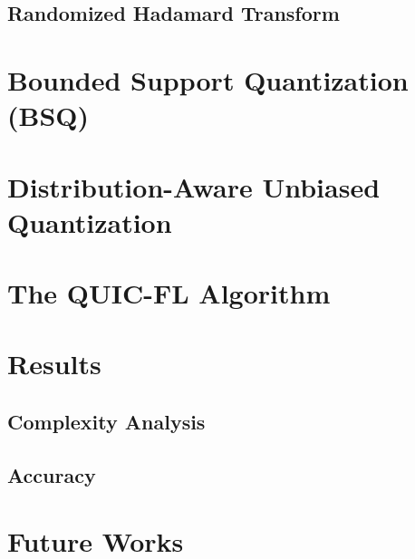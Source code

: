 \documentclass[journal,12pt,twocolumn]{IEEEtran}
\begin{document}
    \subsection{Randomized Hadamard Transform}
    \label{ssec:rht}
\section{Bounded Support Quantization (BSQ)}
\label{sec:bsq}
\section{Distribution-Aware Unbiased Quantization}
\label{sec:dauq}
\section{The QUIC-FL Algorithm}
\label{sec:quicfl}
\section{Results}
\label{sec:res}
    \subsection{Complexity Analysis}
    \label{ssec:res-comp}
    \subsection{Accuracy}
    \label{ssec:res-acc}
\section{Future Works}
\label{sec:future}

\end{document}
